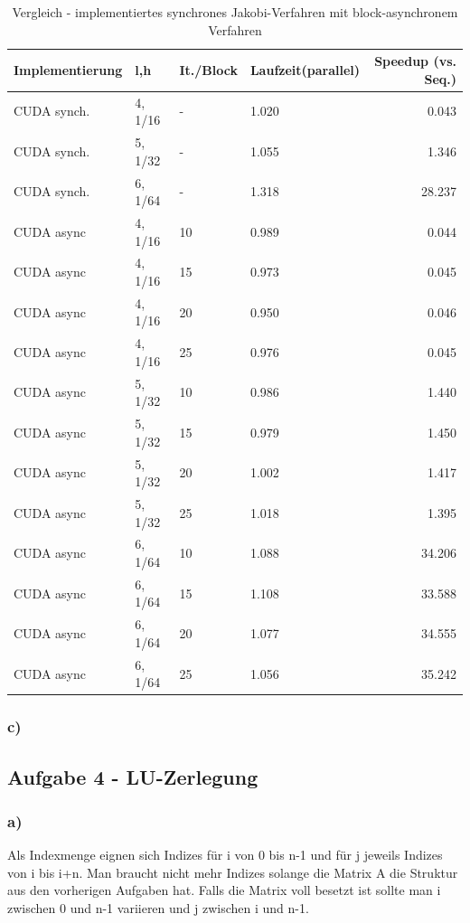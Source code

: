 \documentclass{report}
\begin{document}
\begin{table}
	\begin{tabular}{|l|l|l|l|r|}
		\hline
		Implementierung & l,h & It./Block & Laufzeit(parallel) & Speedup (vs. Seq.)\\

		\hline
		CUDA synch. & 4, 1/16 & - & 1.020 & 0.043 \\
		\hline
		CUDA synch. & 5, 1/32 & - & 1.055 & 1.346 \\
		\hline
		CUDA synch. & 6, 1/64 & - & 1.318 & 28.237 \\
		\hline
		CUDA async & 4, 1/16 & 10 & 0.989 & 0.044 \\
		\hline
		CUDA async & 4, 1/16 & 15 & 0.973 & 0.045 \\
		\hline
		CUDA async & 4, 1/16 & 20 & 0.950 & 0.046 \\
		\hline
		CUDA async & 4, 1/16 & 25 & 0.976 & 0.045 \\
		\hline
		CUDA async & 5, 1/32 & 10 & 0.986 & 1.440 \\
		\hline
		CUDA async & 5, 1/32 & 15 & 0.979 & 1.450 \\
		\hline
		CUDA async & 5, 1/32 & 20 & 1.002 & 1.417 \\
		\hline
		CUDA async & 5, 1/32 & 25 & 1.018 & 1.395 \\
		\hline
		CUDA async & 6, 1/64 & 10 & 1.088 & 34.206 \\
		\hline
		CUDA async & 6, 1/64 & 15 & 1.108 & 33.588 \\
		\hline
		CUDA async & 6, 1/64 & 20 & 1.077 & 34.555 \\
		\hline
		CUDA async & 6, 1/64 & 25 & 1.056 & 35.242 \\

		\hline 
	\end{tabular}
	\caption{Vergleich -  implementiertes synchrones Jakobi-Verfahren mit block-asynchronem Verfahren}
	\label{Table:2_3b}
\end{table}

\subsubsection{c)}

\subsection{Aufgabe 4 - LU-Zerlegung}

\subsubsection{a)}
Als Indexmenge eignen sich Indizes für i von 0 bis n-1 und für j jeweils Indizes von i bis i+n. Man braucht nicht mehr Indizes solange die Matrix A die Struktur aus den vorherigen Aufgaben hat. Falls die Matrix voll besetzt ist sollte man i zwischen 0 und n-1 variieren und j zwischen i und n-1.
\end{document}

